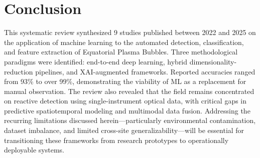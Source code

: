 \section{Conclusion}\label{sec:conclusion}

This systematic review synthesized 9 studies published between 2022 and 2025 on the application of machine learning to the automated detection, classification, and feature extraction of Equatorial Plasma Bubbles. Three methodological paradigms were identified: end-to-end deep learning, hybrid dimensionality-reduction pipelines, and XAI-augmented frameworks. Reported accuracies ranged from 93\% to over 99\%, demonstrating the viability of ML as a replacement for manual observation. The review also revealed that the field remains concentrated on reactive detection using single-instrument optical data, with critical gaps in predictive spatiotemporal modeling and multimodal data fusion. Addressing the recurring limitations discussed herein---particularly environmental contamination, dataset imbalance, and limited cross-site generalizability---will be essential for transitioning these frameworks from research prototypes to operationally deployable systems.
